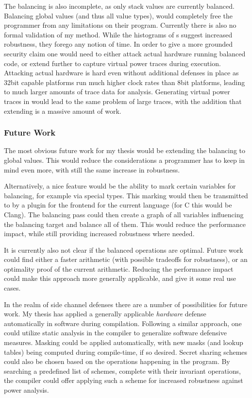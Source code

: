 The balancing is also incomplete, as only stack values are currently balanced.
Balancing global values (and thus all value types), would completely free the programmer from any limitations on their program.
Currently there is also no formal validation of my method.
While the histograms of \hammingw{}s suggest increased robustness, they forego any notion of time.
In order to give a more grounded security claim one would need to either attack actual hardware running balanced code, or extend \qemu{} further to capture virtual power traces during execution.
Attacking actual hardware is hard even without additional defenses in place as 32bit capable platforms run much higher clock rates than 8bit platforms, leading to much larger amounts of trace data for analysis.
Generating virtual power traces in \qemu{} would lead to the same problem of large traces, with the addition that extending \qemu{} is a massive amount of work.

\subsubsection{Future Work}
The most obvious future work for my thesis would be extending the balancing to global values.
This would reduce the considerations a programmer has to keep in mind even more, with still the same increase in robustness.

Alternatively, a nice feature would be the ability to mark certain variables for balancing, for example via special types.
This marking would then be transmitted to \ir{} by a plugin for the frontend for the current language (for C this would be Clang).
The balancing pass could then create a graph of all variables influencing the balancing target and balance all of them.
This would reduce the performance impact, while still providing increased robustness where needed.

It is currently also not clear if the balanced operations are optimal.
Future work could find either a faster arithmetic (with possible tradeoffs for robustness), or an optimality proof of the current arithmetic.
Reducing the performance impact could make this approach more generally applicable, and give it some real use cases.

In the realm of side channel defenses there are a number of possibilities for future work.
My thesis has applied a generally applicable \emph{hardware} defense automatically in software during compilation.
Following a similar approach, one could utilize static analysis in the compiler to generalize software defensive measures.
Masking could be applied automatically, with new masks (and lookup tables) being computed during compile-time, if so desired.
Secret sharing schemes could also be chosen based on the operations happening in the program.
By searching a predefined list of schemes, complete with their invariant operations, the compiler could offer applying such a scheme for increased robustness against power analysis.

